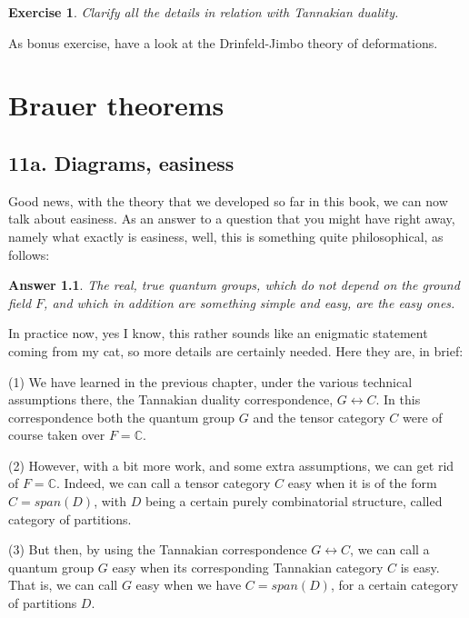 \documentclass[12pt]{amsbook}
\newtheorem{answer}[theorem]{Answer}
\newtheorem{exercise}[theorem]{Exercise}
\begin{document}
\begin{exercise}
Clarify all the details in relation with Tannakian duality.
\end{exercise}

As bonus exercise, have a look at the Drinfeld-Jimbo theory of deformations.

\chapter{Brauer theorems}

\section*{11a. Diagrams, easiness}

Good news, with the theory that we developed so far in this book, we can now talk about easiness. As an answer to a question that you might have right away, namely what exactly is easiness, well, this is something quite philosophical, as follows:

\begin{answer}
The real, true quantum groups, which do not depend on the ground field $F$, and which in addition are something simple and easy, are the easy ones.
\end{answer}

In practice now, yes I know, this rather sounds like an enigmatic statement coming from my cat, so more details are certainly needed. Here they are, in brief:

\bigskip

(1) We have learned in the previous chapter, under the various technical assumptions there, the Tannakian duality correspondence, $G\leftrightarrow C$. In this correspondence both the quantum group $G$ and the tensor category $C$ were of course taken over $F=\mathbb C$.

\bigskip

(2) However, with a bit more work, and some extra assumptions, we can get rid of $F=\mathbb C$. Indeed, we can call a tensor category $C$ easy when it is of the form $C=span(D)$, with $D$ being a certain purely combinatorial structure, called category of partitions.

\bigskip

(3) But then, by using the Tannakian correspondence $G\leftrightarrow C$, we can call a quantum group $G$ easy when its corresponding Tannakian category $C$ is easy. That is, we can call $G$ easy when we have $C=span(D)$, for a certain category of partitions $D$.
\end{document}
